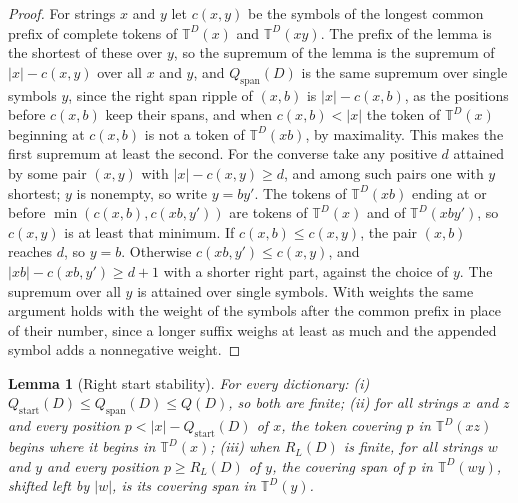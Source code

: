 \documentclass[11pt,a4paper]{article}
\theoremstyle{definition}
\theoremstyle{plain}
\newtheorem{lemma}{Lemma}
\newcommand{\T}{\mathbb{T}}
\newcommand{\ripple}{R_{L}}
\begin{document}
\begin{proof} For strings \(x\) and \(y\) let \(c(x, y)\) be the symbols of the longest common prefix of complete tokens
of \(\T^D(x)\) and \(\T^D(xy)\). The prefix of the lemma is the shortest of these over \(y\), so the supremum of the
lemma is the supremum of \(|x| - c(x, y)\) over all \(x\) and \(y\), and \(Q_{\mathrm{span}}(D)\) is the same supremum
over single symbols \(y\), since the right span ripple of \((x, b)\) is \(|x| - c(x, b)\), as the positions before
\(c(x, b)\) keep their spans, and when \(c(x, b) < |x|\) the token of \(\T^D(x)\) beginning at \(c(x, b)\) is not a
token of \(\T^D(xb)\), by maximality. This makes the first supremum at least the second. For the converse take any
positive \(d\) attained by some pair \((x, y)\) with \(|x| - c(x, y) \ge d\), and among such pairs one with \(y\)
shortest; \(y\) is nonempty, so write \(y = by'\). The tokens of \(\T^D(xb)\) ending at or before
\(\min(c(x, b), c(xb, y'))\) are tokens of \(\T^D(x)\) and of \(\T^D(xby')\), so \(c(x, y)\) is at least that minimum.
If \(c(x, b) \le c(x, y)\), the pair \((x, b)\) reaches \(d\), so \(y = b\). Otherwise \(c(xb, y') \le c(x, y)\), and
\(|xb| - c(xb, y') \ge d + 1\) with a shorter right part, against the choice of \(y\). The supremum over all \(y\) is
attained over single symbols. With weights the same argument holds with the weight of the symbols after the common
prefix in place of their number, since a longer suffix weighs at least as much and the appended symbol adds a
nonnegative weight.
\end{proof}


\begin{lemma}[Right start stability]\label{lem:rightstart}
For every dictionary: (i) \(Q_{\mathrm{start}}(D) \le Q_{\mathrm{span}}(D) \le Q(D)\), so both are finite; (ii) for all
strings \(x\) and \(z\) and every position \(p < |x| - Q_{\mathrm{start}}(D)\) of \(x\), the token covering \(p\) in
\(\T^D(xz)\) begins where it begins in \(\T^D(x)\); (iii) when \(\ripple(D)\) is finite, for all strings \(w\) and \(y\)
and every position \(p \ge \ripple(D)\) of \(y\), the covering span of \(p\) in \(\T^D(wy)\), shifted left by \(|w|\),
is its covering span in \(\T^D(y)\).
\end{lemma}
\end{document}
